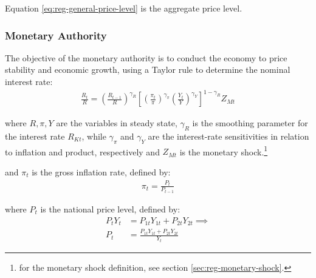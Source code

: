 \documentclass[
thesis.tex
]{subfiles}
\begin{document}
Equation \ref{eq:reg-general-price-level} is the aggregate price level.


\subsubsection{Monetary Authority}

The objective of the monetary authority is to conduct the economy to price stability and economic growth, using a Taylor rule \cite{taylor_discretion_1993} to determine the nominal interest rate:
\begin{align}
	\label{eq:reg-monetary-policy}
	\frac{R_{t}}{R} =
	\left( \frac{R_{t-1}}{R} \right)^{\gamma_R}  \left[
	\left( \frac{\pi_t}{\pi} \right)^{\gamma_\pi}
	\left( \frac{Y_{t}}{Y} \right)^{\gamma_Y} \right]^{1-\gamma_R} Z_{Mt}
\end{align}

where $R, \pi, Y$ are the variables in steady state, $\gamma_R$ is the smoothing parameter for the interest rate $R_{Kt}$, while $\gamma_\pi$ and $\gamma_Y$ are the interest-rate sensitivities in relation to inflation and product, respectively and $Z_{Mt}$ is the monetary shock.\footnote{for the monetary shock definition, see section \ref{sec:reg-monetary-shock}.}

and $\pi_t$ is the gross inflation rate, defined by:
\begin{align}
	\pi_t = \frac{P_t}{P_{t-1}}
	\label{eq:reg-gross-inflation-rate}
\end{align}

where $P_t$ is the national price level, defined by:
\begin{align}
	P_{t} Y_{t} &= P_{1t} Y_{1t} + P_{2t} Y_{2t} \implies \nonumber \\
	P_{t} &= \frac{P_{1t} Y_{1t} + P_{2t} Y_{2t}}{Y_{t}} \label{eq:national-price-level}
\end{align}
\end{document}

